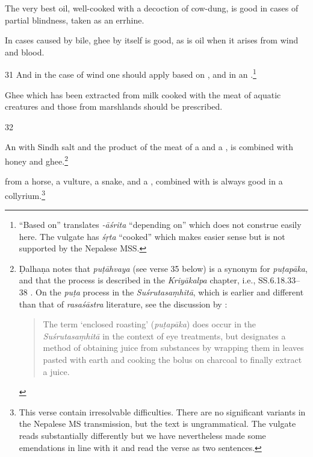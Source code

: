 \begin{translation}
    The very best oil, well-cooked with a decoction of cow-dung, is good in cases of 
    partial blindness, taken as an errhine.
    
    In cases caused by bile, ghee by itself is good, as is oil when it arises from wind and 
    blood.
    
    \item[31]
    And in the case of wind one should apply
     based on
    ,
    and 
    in an .\footnote{“Based on” translates \emph{-āśrita} 
    “depending on” which does not construe easily here.  The vulgate has \emph{śṛta} 
    “cooked” which makes easier sense but is not supported by the Nepalese MSS.}
    
    Ghee which has been extracted from milk cooked with the meat of aquatic 
    creatures and those from marshlands should be prescribed.
    
    \item[32]
    
    \dag An  with  Sindh salt and the product of the
    meat of a  and a , is combined with 
    honey
    and ghee.\footnote{Ḍalhaṇa notes \citep[628a]{vulgate} that \emph{puṭāhvaya} 
    (see
    verse 35 below) is a synonym for \emph{puṭapāka}, and that the process is
    described in the \emph{Kriyākalpa} chapter, i.e., SS.6.18.33--38
    \citep[635]{vulgate}.  On the \emph{puṭa} process in the 
    \emph{Suśrutasaṃhitā},
    which is earlier and different than that of \emph{rasaśāstra} literature, see the
    discussion by  \citet[83]{wujad-2019}:
    \begin{quote}
        The term ‘enclosed roasting’ (\emph{puṭapāka}) does occur in
        the \emph{Suśrutasaṃhitā} in the context of eye treatments, but
        designates a method of obtaining juice from substances by
        wrapping them in leaves pasted with earth and cooking
        the bolus on charcoal to finally extract a juice.
    \end{quote}
    } %
    
     from a horse, a vulture, a snake, and a ,
    combined with  is always good in a 
    collyrium.\dag\footnote{This
    verse contain irresolvable difficulties. There are no significant variants in the
    Nepalese MS transmission, but the text is ungrammatical.   The vulgate reads
    substantially differently but we have nevertheless made some emendations in line
    with it and read the verse as two sentences.}
    

\end{translation}
